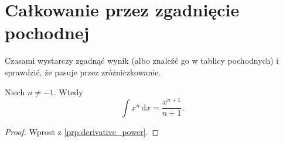%

\section{Całkowanie przez zgadnięcie pochodnej}

Czasami wystarczy zgadnąć wynik (albo znaleźć go w tablicy pochodnych) i sprawdzić, że pasuje przez zróżniczkowanie.

\begin{integral}
    Niech $n \neq -1$.
    Wtedy
    \begin{equation}
        \int x^n \,\mathrm{d}x = \frac{x^{n+1}}{n+1}.
    \end{equation}
\end{integral}

\begin{proof}
    Wprost z \ref{prp:derivative_power}.
\end{proof}

%